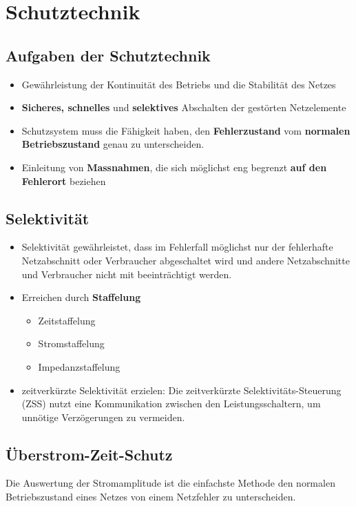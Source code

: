 \section{Schutztechnik}
\subsection{Aufgaben der Schutztechnik}
    \begin{itemize}
    \item Gewährleistung der Kontinuität des Betriebs und die Stabilität des Netzes
    \item \textbf{Sicheres, schnelles} und \textbf{selektives} Abschalten der gestörten Netzelemente
    \item Schutzsystem muss die Fähigkeit haben, den \textbf{Fehlerzustand} vom \textbf{normalen Betriebszustand} genau zu unterscheiden.
    \item Einleitung von \textbf{Massnahmen}, die sich möglichst eng begrenzt \textbf{auf den Fehlerort} beziehen
    \end{itemize}

\subsection{Selektivität}
    \begin{itemize}
    \item Selektivität gewährleistet, dass im Fehlerfall möglichst nur der fehlerhafte Netzabschnitt oder Verbraucher abgeschaltet wird und andere Netzabschnitte und Verbraucher nicht mit beeinträchtigt werden.
    \item Erreichen durch \textbf{Staffelung}
    \begin{itemize}
        \item Zeitstaffelung
        \item Stromstaffelung
        \item Impedanzstaffelung
    \end{itemize}
    \item zeitverkürzte Selektivität erzielen:
    Die zeitverkürzte Selektivitäts-Steuerung (ZSS) nutzt eine Kommunikation zwischen den Leistungsschaltern, um unnötige Verzögerungen zu vermeiden.
    \end{itemize}

\subsection{Überstrom-Zeit-Schutz}
    Die Auswertung der Stromamplitude ist die einfachste Methode den normalen Betriebszustand eines Netzes von einem Netzfehler zu unterscheiden.

